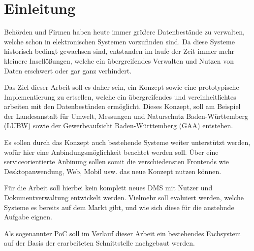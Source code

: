 \section{Einleitung}
Beh\"orden und Firmen haben heute immer gr\"o\ss{}ere Datenbest\"ande zu verwalten, welche schon in elektronischen Systemen vorzufinden sind. Da diese Systeme historisch bedingt gewachsen sind, entstanden im laufe der Zeit immer mehr kleinere Insell\"o\ss{}ungen, welche ein \"ubergreifendes Verwalten und Nutzen von Daten erschwert oder gar ganz verhindert.

Das Ziel dieser Arbeit soll es daher sein, ein Konzept sowie eine prototypische Implementierung zu ertsellen, welche ein \"ubergreifendes und vereinheitlichtes arbeiten mit den Datenbest\"anden erm\"oglicht. Dieses Konzept, soll am Beispiel der Landesanstalt f\"ur Umwelt, Messungen und Naturschutz Baden-W\"urttemberg (LUBW) sowie der Gewerbeaufsicht Baden-W\"urttemberg (GAA) entstehen.

Es sollen durch das Konzept auch bestehende Systeme weiter unterst\"utzt werden, wof\"ur hier eine Anbindungsm\"oglichkeit beachtet werden soll. \"Uber eine serviceorientierte Anbinung sollen somit die verschiedensten Frontends wie Desktopanwendung, Web, Mobil usw. das neue Konzept nutzen k\"onnen.

F\"ur die Arbeit soll hierbei kein komplett neues \ac{DMS} mit Nutzer und Dokumentverwaltung entwickelt werden. Vielmehr soll evaluiert werden, welche Systeme es bereits auf dem Markt gibt, und wie sich diese f\"ur die anstehnde Aufgabe eignen. 

Als sogenannter \ac{PoC} soll im Verlauf dieser Arbeit ein bestehendes Fachsystem auf der Basis der erarbeiteten Schnittstelle nachgebaut werden.